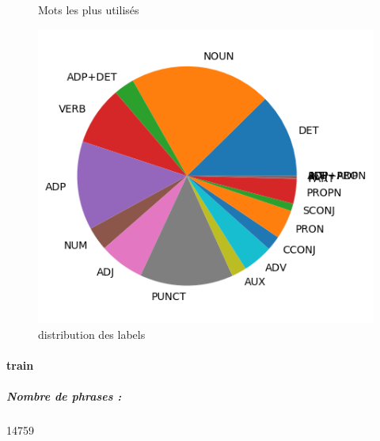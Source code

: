 \begin{figure}[H]
\begin{minipage}{0.48\textwidth}
\begin{tabular}{|l || *{11 }{|c} |}
\end{tabular}
\caption{ Mots les plus utilisés } \label{Fig:muw}\end{minipage} 
\begin{minipage}{0.48\textwidth} \centering
\includegraphics[width=.7\linewidth]{ftbtest_img.png}
\caption{distribution des labels}
\end{minipage}
\end{figure} \paragraph{train } 
\subparagraph{Nombre de phrases :} 14759\\ 
